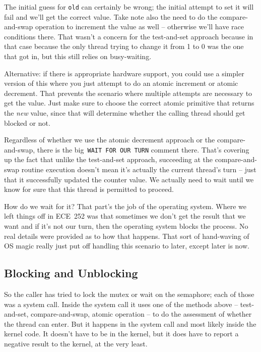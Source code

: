 The initial guess for \texttt{old} can certainly be wrong; the initial attempt to set it will fail and we'll get the correct value. Take note also the need to do the compare-and-swap operation to increment the value as well -- otherwise we'll have race conditions there. That wasn't a concern for the test-and-set approach because in that case because the only thread trying to change it from 1 to 0 was the one that got in, but this still relies on busy-waiting.

Alternative: if there is appropriate hardware support, you could use a simpler version of this where you just attempt to do an atomic increment or atomic decrement. That prevents the scenario where multiple attempts are necessary to get the value. Just make sure to choose the correct atomic primitive that returns the \textit{new} value, since that will determine whether the calling thread should get blocked or not. 

Regardless of whether we use the atomic decrement approach or the compare-and-swap, there is the big~\texttt{WAIT FOR OUR TURN} comment there. That's covering up the fact that unlike the test-and-set approach, succeeding at the compare-and-swap routine execution doesn't mean it's actually the current thread's turn -- just that it successfully updated the counter value. We actually need to wait until we know for sure that this thread is permitted to proceed.

How do we wait for it? That part's the job of the operating system. Where we left things off in ECE~252 was that sometimes we don't get the result that we want and if it's not our turn, then the operating system blocks the process. No real details were provided as to how that happens. That sort of hand-waving of OS magic really just put off handling this scenario to later, except later is now.

\subsection*{Blocking and Unblocking}

So the caller has tried to lock the mutex or wait on the semaphore; each of those was a system call. Inside the system call it uses one of the methods above -- test-and-set, compare-and-swap, atomic operation -- to do the assessment of whether the thread can enter. But it happens in the system call and most likely inside the kernel code. It doesn't have to be in the kernel, but it does have to report a negative result to the kernel, at the very least.

